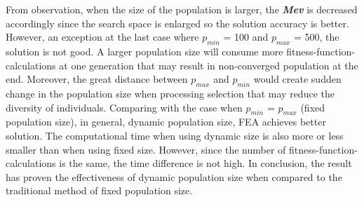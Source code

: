 \documentclass[final]{elsarticle}
\begin{document}
From observation, when the size of the population is larger, the \textit{\textbf{Mev}} is decreased accordingly since the search space is enlarged so the solution accuracy is better. However, an exception at the last case where $p_{min}$ = 100 and $p_{max}$ = 500, the solution is not good. A larger population size will consume more fitness-function-calculations at one generation that may result in non-converged population at the end. Moreover, the great distance between \textbf{$p_{max}$} and $p_{min}$ would create sudden change in the population size when processing selection that may reduce the diversity of individuals. Comparing with the case when $p_{min} $ = $ p_{max} $ (fixed population size), in general, dynamic population size, FEA achieves better solution. The computational time when using dynamic size is also more or less smaller than when using fixed size. However, since the number of fitness-function-calculations is the same, the time difference is not high. In conclusion, the result has proven the effectiveness of dynamic population size when compared to the traditional method of fixed population size. 
%
\end{document}
